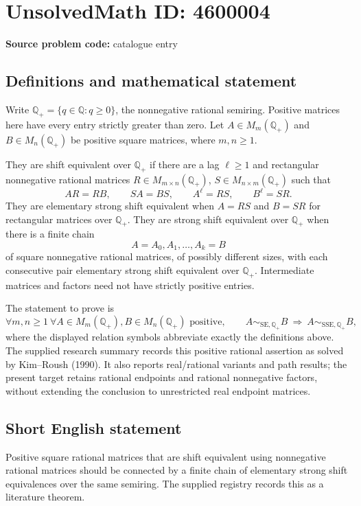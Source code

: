 \documentclass[11pt]{article}
\newcommand{\Q}{\mathbb{Q}}
\begin{document}
\section*{UnsolvedMath ID: 4600004}
\textbf{Source problem code:} catalogue entry
\subsection{Definitions and mathematical statement}
Write \(\Q_+=\{q\in\Q:q\ge0\}\), the nonnegative rational semiring. Positive matrices here have every entry strictly greater than zero. Let \(A\in M_m(\Q_+)\) and \(B\in M_n(\Q_+)\) be positive square matrices, where \(m,n\ge1\).

They are shift equivalent over \(\Q_+\) if there are a lag \(\ell\ge1\) and rectangular nonnegative rational matrices \(R\in M_{m\times n}(\Q_+)\), \(S\in M_{n\times m}(\Q_+)\) such that
\[
AR=RB,\qquad SA=BS,\qquad A^\ell=RS,\qquad B^\ell=SR.
\]
They are elementary strong shift equivalent when \(A=RS\) and \(B=SR\) for rectangular matrices over \(\Q_+\). They are strong shift equivalent over \(\Q_+\) when there is a finite chain
\[
A=A_0,A_1,\ldots,A_k=B
\]
of square nonnegative rational matrices, of possibly different sizes, with each consecutive pair elementary strong shift equivalent over \(\Q_+\). Intermediate matrices and factors need not have strictly positive entries.

The statement to prove is
\[
\forall m,n\ge1\ \forall A\in M_m(\Q_+),B\in M_n(\Q_+)
\text{ positive},\qquad
A\sim_{\mathrm{SE},\Q_+}B\ \Longrightarrow\ A\sim_{\mathrm{SSE},\Q_+}B,
\]
where the displayed relation symbols abbreviate exactly the definitions above. The supplied research summary records this positive rational assertion as solved by Kim--Roush (1990). It also reports real/rational variants and path results; the present target retains rational endpoints and rational nonnegative factors, without extending the conclusion to unrestricted real endpoint matrices.
\subsection{Short English statement}
Positive square rational matrices that are shift equivalent using nonnegative rational matrices should be connected by a finite chain of elementary strong shift equivalences over the same semiring. The supplied registry records this as a literature theorem.
\end{document}
